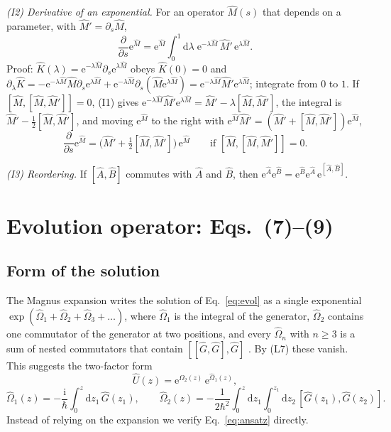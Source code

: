 \documentclass[aps,pra,onecolumn,notitlepage,11pt,amsmath,amssymb,nofootinbib]{revtex4-2}
\newcommand{\dd}{\mathrm{d}}
\newcommand{\ee}{\mathrm{e}}
\newcommand{\ii}{\mathrm{i}}
\begin{document}
\emph{(I2) Derivative of an exponential.} For an operator $\hat M(s)$ that
depends on a parameter, with $\hat M'=\partial_s\hat M$,
\begin{equation}
\frac{\partial}{\partial s}\ee^{\hat M}
=\ee^{\hat M}\!\int_0^1\!\dd\lambda\;\ee^{-\lambda\hat M}\,\hat M'\,\ee^{\lambda\hat M}.
\label{eq:duhamel}
\end{equation}
Proof: $\hat K(\lambda)=\ee^{-\lambda\hat M}\partial_s\ee^{\lambda\hat M}$
obeys $\hat K(0)=0$ and
$\partial_\lambda\hat K=-\ee^{-\lambda\hat M}\hat M\partial_s\ee^{\lambda\hat M}
+\ee^{-\lambda\hat M}\partial_s(\hat M\ee^{\lambda\hat M})
=\ee^{-\lambda\hat M}\hat M'\ee^{\lambda\hat M}$; integrate from $0$ to $1$.
If $[\hat M,[\hat M,\hat M']]=0$, (I1) gives
$\ee^{-\lambda\hat M}\hat M'\ee^{\lambda\hat M}=\hat M'-\lambda[\hat M,\hat M']$,
the integral is $\hat M'-\tfrac12[\hat M,\hat M']$, and moving $\ee^{\hat M}$
to the right with $\ee^{\hat M}\hat M'=(\hat M'+[\hat M,\hat M'])\ee^{\hat M}$,
\begin{equation}
\frac{\partial}{\partial s}\ee^{\hat M}
=\Big(\hat M'+\tfrac12[\hat M,\hat M']\Big)\,\ee^{\hat M}
\qquad\text{if }[\hat M,[\hat M,\hat M']]=0 .
\label{eq:I2}
\end{equation}

\emph{(I3) Reordering.} If $[\hat A,\hat B]$ commutes with $\hat A$ and
$\hat B$, then $\ee^{\hat A}\ee^{\hat B}=\ee^{\hat B}\ee^{\hat A}\,\ee^{[\hat A,\hat B]}$.

\section{Evolution operator: Eqs.~(7)--(9)}
\label{sec:U}

\subsection{Form of the solution}

The Magnus expansion writes the solution of Eq.~\eqref{eq:evol} as a single
exponential $\exp(\hat\Omega_1+\hat\Omega_2+\hat\Omega_3+\dots)$, where
$\hat\Omega_1$ is the integral of the generator, $\hat\Omega_2$ contains one
commutator of the generator at two positions, and every $\hat\Omega_n$ with
$n\ge3$ is a sum of nested commutators that contain $[[\hat G,\hat G],\hat G]$
\cite{blanes2009}. By (L7) these vanish. This suggests the two-factor form
\begin{equation}
\hat U(z)=\ee^{\hat\Omega_2(z)}\,\ee^{\hat\Omega_1(z)},
\label{eq:ansatz}
\end{equation}
\begin{equation}
\hat\Omega_1(z)=-\frac{\ii}{\hbar}\int_0^z\!\dd z_1\,\hat G(z_1),\qquad
\hat\Omega_2(z)=-\frac{1}{2\hbar^2}\int_0^z\!\dd z_1\!\int_0^{z_1}\!\!\dd z_2\,
[\hat G(z_1),\hat G(z_2)] .
\label{eq:Om}
\end{equation}
Instead of relying on the expansion we verify Eq.~\eqref{eq:ansatz} directly.
\end{document}

